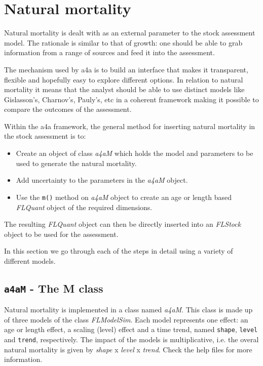 \documentclass[a4paper,english,10pt]{article}\usepackage[]{graphicx}\usepackage[]{color}
\newcommand{\code}[1]{{\texttt{#1}}}
\newcommand{\class}[1]{{\textit{#1}}}
\begin{document}
\pagebreak
\section{Natural mortality}

Natural mortality is dealt with as an external parameter to the stock assessment model. The rationale is similar to that of growth: one should be able to grab information from a range of sources and feed it into the assessment.

The mechanism used by a4a is to build an interface that makes it transparent, flexible and hopefully easy to explore different options. In relation to natural mortality it means that the analyst should be able to use distinct models like Gislasson's, Charnov's, Pauly's, etc in a coherent framework making it possible to compare the outcomes of the assessment. 

Within the a4a framework, the general method for inserting natural mortality in the stock assessment is to:

\begin{itemize}
    \item Create an object of class \class{a4aM} which holds the model and parameters to be used to generate the natural mortality.
    \item Add uncertainty to the parameters in the \class{a4aM} object.
    \item Use the \code{m()} method on \class{a4aM} object to create an age or length based \class{FLQuant} object of the required dimensions.
\end{itemize}

The resulting \class{FLQuant} object can then be directly inserted into an \class {FLStock} object to be used for the assessment.   

In this section we go through each of the steps in detail using a variety of different models.

\subsection{\code{a4aM} - The M class}

Natural mortality is implemented in a class named \class{a4aM}. This class is made up of three models of the class \class{FLModelSim}. Each model represents one effect: an age or length effect, a scaling (level) effect and a time trend, named \code{shape}, \code{level} and \code{trend}, respectively. The impact of the models is multiplicative, i.e. the overal natural mortality is given by \class{shape} x  \class{level} x \class{trend}. Check the help files for more information.
\end{document}
